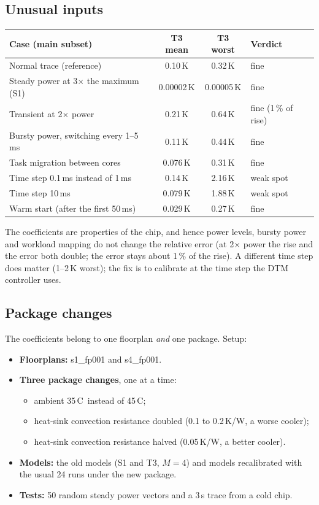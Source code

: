 \documentclass[11pt,a4paper]{article}
\newcommand{\degC}{\,\textdegree C}
\begin{document}
\subsection{Unusual inputs}
\begin{center}
\small
\begin{tabular}{@{}l c c l@{}}
\toprule
Case (main subset) & T3 mean & T3 worst & Verdict \\
\midrule
Normal trace (reference) & 0.10\,K & 0.32\,K & fine \\
Steady power at 3$\times$ the maximum (S1) & 0.00002\,K & 0.00005\,K & fine \\
Transient at 2$\times$ power & 0.21\,K & 0.64\,K & fine (1\,\% of rise) \\
Bursty power, switching every 1--5\,ms & 0.11\,K & 0.44\,K & fine \\
Task migration between cores & 0.076\,K & 0.31\,K & fine \\
Time step 0.1\,ms instead of 1\,ms & 0.14\,K & 2.16\,K & weak spot \\
Time step 10\,ms & 0.079\,K & 1.88\,K & weak spot \\
Warm start (after the first 50\,ms) & 0.029\,K & 0.27\,K & fine \\
\bottomrule
\end{tabular}
\end{center}
The coefficients are properties of the chip, and hence power levels, bursty power and workload
mapping do not change the relative error (at 2$\times$ power the rise and the error both double;
the error stays about 1\,\% of the rise). A different time step does matter (1--2\,K worst); the
fix is to calibrate at the time step the DTM controller uses.

\subsection{Package changes}
The coefficients belong to one floorplan \emph{and} one package. Setup:
\begin{itemize}
  \item \textbf{Floorplans:} s1\_fp001 and s4\_fp001.
  \item \textbf{Three package changes}, one at a time:
  \begin{itemize}
    \item ambient 35\degC\ instead of 45\degC;
    \item heat-sink convection resistance doubled (0.1 to 0.2\,K/W, a worse cooler);
    \item heat-sink convection resistance halved (0.05\,K/W, a better cooler).
  \end{itemize}
  \item \textbf{Models:} the old models (S1 and T3, $M=4$) and models recalibrated with the usual
        24 runs under the new package.
  \item \textbf{Tests:} 50 random steady power vectors and a 3\,s trace from a cold chip.
\end{itemize}
\end{document}
